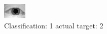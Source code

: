 \begin{figure}[h!]
\begin{center}
\includegraphics[width=0.60\columnwidth]{figures/ID922_class_1_target_2.png}
\end{center}
\caption{ Classification: 1 actual target: 2}
\label{fig:ID922_class_1_target_2}
\end{figure}
